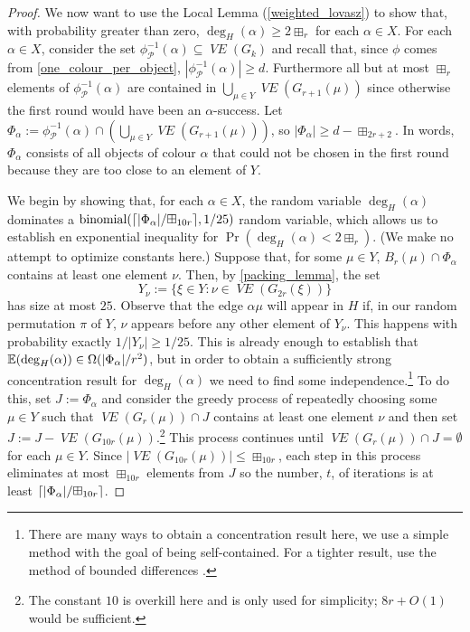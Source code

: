 \documentclass{patmorin}
\newcommand{\vol}[1]{\boxplus_{#1}}
\DeclareMathOperator{\binomial}{binomial}
\DeclareMathOperator{\VE}{\mathit{VE}}
\begin{document}
\begin{proof}
  We now want to use the Local Lemma (\cref{weighted_lovasz}) to show that, with probability greater than zero, $\deg_H(\alpha)\ge 2\vol{r}$ for each $\alpha\in X$.
  For each $\alpha\in X$, consider the set $\phi^{-1}_{\mathcal{P}}(\alpha)\subseteq \VE(G_k)$ and recall that, since $\phi$ comes from \cref{one_colour_per_object}, $|\phi^{-1}_{\mathcal{P}}(\alpha)| \ge d$.  Furthermore all but at most $\vol{r}$ elements of $\phi^{-1}_{\mathcal{P}}(\alpha)$ are contained in $\bigcup_{\mu\in Y}\VE(G_{r+1}(\mu))$ since otherwise the first round would have been an $\alpha$-success.  Let $\Phi_\alpha:=\phi^{-1}_{\mathcal{P}}(\alpha)\cap \left(\bigcup_{\mu\in Y}\VE(G_{r+1}(\mu))\right)$, so $|\Phi_\alpha|\ge d-\vol{2r+2}$.  In words, $\Phi_\alpha$ consists of all objects of colour $\alpha$ that could not be chosen in the first round because they are too close to an element of $Y$.



  We begin by showing that, for each $\alpha\in X$, the random variable $\deg_H(\alpha)$ dominates a $\binomial(\ceil{|\Phi_\alpha|/\vol{10r}},1/25)$ random variable, which allows us to establish en exponential inequality for $\Pr(\deg_H(\alpha) < 2\vol{r})$.  (We make no attempt to optimize constants here.)  Suppose that, for some $\mu\in Y$, $B_r(\mu)\cap \Phi_\alpha$ contains at least one element $\nu$. Then, by \cref{packing_lemma}, the set
  \[
     Y_\nu := \{\xi\in Y:\nu\in\VE(G_{2r}(\xi))\}
  \]
  has size at most $25$. Observe that the edge $\alpha\mu$ will appear in $H$ if, in our random permutation $\pi$ of $Y$, $\nu$ appears before any other element of $Y_\nu$.  This happens with probability exactly $1/|Y_\nu|\ge 1/25$. This is already enough to establish that $\mathbb{E}(\deg_H(\alpha)) \in \Omega(|\Phi_\alpha|/r^2)$, but in order to obtain a sufficiently strong concentration result for $\deg_H(\alpha)$ we need to find some independence.\footnote{There are many ways to obtain a concentration result here, we use a simple method with the goal of being self-contained.  For a tighter result, use the method of bounded differences \cite{mcdiarmid:on}.}  To do this, set $J:=\Phi_\alpha$ and consider the greedy process of repeatedly choosing some $\mu\in Y$ such that $\VE(G_r(\mu))\cap J$ contains at least one element $\nu$ and then set $J:=J-\VE(G_{10r}(\mu))$.\footnote{The constant $10$ is overkill here and is only used for simplicity; $8r+O(1)$ would be sufficient.}  This process continues until $\VE(G_r(\mu))\cap J=\emptyset$ for each $\mu\in Y$. Since $|\VE(G_{10r}(\mu))|\le \vol{10r}$, each step in this process eliminates at most $\vol{10r}$ elements from $J$ so the number, $t$, of iterations is at least $\ceil{|\Phi_\alpha|/\vol{10r}}$.


\end{proof}
\end{document}
